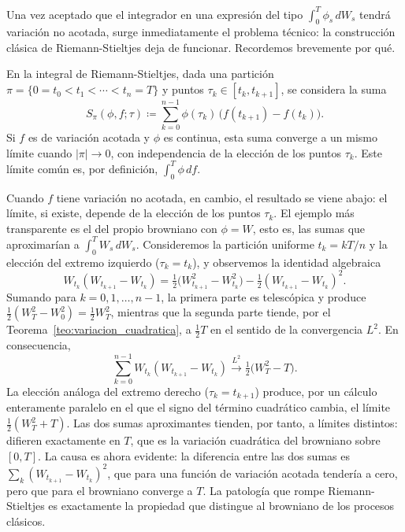 \documentclass[11pt,a4paper,oneside]{report}
\theoremstyle{plain}
\theoremstyle{definition}
\theoremstyle{remark}
\newcommand{\1}{\mathbf{1}}
\newcommand{\eqdef}{\coloneqq}
\begin{document}
Una vez aceptado
que el integrador en una expresión del tipo $\int_0^T \phi_s\, dW_s$
tendrá variación no acotada, surge inmediatamente el problema técnico:
la construcción clásica de Riemann-Stieltjes deja de funcionar.
Recordemos brevemente por qué.

En la integral de Riemann-Stieltjes, dada una partición $\pi = \{0 =
t_0 < t_1 < \cdots < t_n = T\}$ y puntos $\tau_k \in [t_k, t_{k+1}]$,
se considera la suma
\begin{equation*}
  S_\pi(\phi, f; \tau) \eqdef \sum_{k=0}^{n-1} \phi(\tau_k)\,
                              \bigl(f(t_{k+1}) - f(t_k)\bigr).
\end{equation*}
Si $f$ es de variación acotada y $\phi$ es continua, esta suma converge
a un mismo límite cuando $|\pi| \to 0$, con independencia de la
elección de los puntos $\tau_k$. Este límite común es, por definición,
$\int_0^T \phi\, df$.

Cuando $f$ tiene variación no acotada, en cambio, el resultado se
viene abajo: el límite, si existe, depende de la elección de los
puntos $\tau_k$. El ejemplo más transparente es el del propio browniano
con $\phi = W$, esto es, las sumas que aproximarían a $\int_0^T W_s\,
dW_s$. Consideremos la partición uniforme $t_k = kT/n$ y la elección
del extremo izquierdo ($\tau_k = t_k$), y observemos la identidad
algebraica
\begin{equation*}
  W_{t_k}(W_{t_{k+1}} - W_{t_k})
  = \tfrac{1}{2}\bigl(W_{t_{k+1}}^2 - W_{t_k}^2\bigr)
   - \tfrac{1}{2}(W_{t_{k+1}} - W_{t_k})^2.
\end{equation*}
Sumando para $k = 0, 1, \ldots, n-1$, la primera parte es telescópica
y produce $\tfrac{1}{2}(W_T^2 - W_0^2) = \tfrac{1}{2} W_T^2$, mientras
que la segunda parte tiende, por el
Teorema~\ref{teo:variacion_cuadratica}, a $\tfrac{1}{2} T$ en el
sentido de la convergencia $L^2$. En consecuencia,
\begin{equation}\label{eq:suma_izq}
  \sum_{k=0}^{n-1} W_{t_k}(W_{t_{k+1}} - W_{t_k})
  \xrightarrow{L^2} \tfrac{1}{2}\bigl(W_T^2 - T\bigr).
\end{equation}
La elección análoga del extremo derecho ($\tau_k = t_{k+1}$) produce,
por un cálculo enteramente paralelo en el que el signo del término
cuadrático cambia, el límite $\tfrac{1}{2}(W_T^2 + T)$. Las dos sumas
aproximantes tienden, por tanto, a límites distintos: difieren
exactamente en $T$, que es la variación cuadrática del browniano sobre
$[0, T]$. La causa es ahora evidente: la diferencia entre las dos
sumas es $\sum_k (W_{t_{k+1}} - W_{t_k})^2$, que para una función de
variación acotada tendería a cero, pero que para el browniano
converge a $T$. La patología que rompe Riemann-Stieltjes es exactamente
la propiedad que distingue al browniano de los procesos clásicos.
\end{document}
